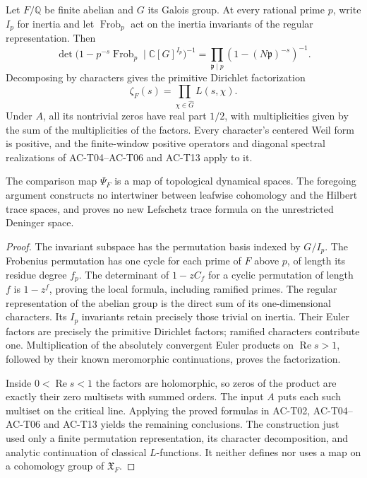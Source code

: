 \begin{theorem}
\label{AC-T18}
Let \(F/\mathbb Q\) be finite abelian and \(G\) its Galois group.
At every rational prime \(p\), write \(I_p\) for inertia and let
\(\operatorname{Frob}_p\) act on the inertia invariants of the
regular representation.  Then
\[
 \det\bigl(1-p^{-s}\operatorname{Frob}_p\mid
                    \mathbb C[G]^{I_p}\bigr)^{-1}
   =\prod_{\mathfrak p\mid p}(1-(N\mathfrak p)^{-s})^{-1}.
\]
Decomposing by characters gives the primitive Dirichlet
factorization
\[
 \zeta_F(s)=\prod_{\chi\in\widehat G}L(s,\chi).
\]
Under \(A\), all its nontrivial zeros have real part \(1/2\),
with multiplicities given by the sum of the multiplicities of
the factors.  Every character's centered Weil form is positive,
and the finite-window positive operators and diagonal spectral
realizations of AC-T04--AC-T06 and AC-T13 apply to it.

The comparison map \(\Psi_F\) is a map of topological dynamical
spaces.  The foregoing argument constructs no intertwiner
between leafwise cohomology and the Hilbert trace spaces, and
proves no new Lefschetz trace formula on the unrestricted
Deninger space.
\end{theorem}
\begin{proof}
The invariant subspace has the permutation basis indexed by
\(G/I_p\).  The Frobenius permutation has one cycle for each
prime of \(F\) above \(p\), of length its residue degree \(f_p\).
The determinant of \(1-zC_f\) for a cyclic permutation of length
\(f\) is \(1-z^f\), proving the local formula, including ramified
primes.  The regular representation of the abelian group is the
direct sum of its one-dimensional characters.  Its \(I_p\)
invariants retain precisely those trivial on inertia.
Their Euler factors are precisely the primitive Dirichlet
factors; ramified characters contribute one.
Multiplication of the absolutely convergent Euler products on
\(\operatorname{Re}s>1\), followed by their known meromorphic
continuations, proves the factorization.

Inside \(0<\operatorname{Re}s<1\) the factors are holomorphic,
so zeros of the product are exactly their zero multisets with
summed orders.  The input \(A\) puts each such multiset on the
critical line.  Applying the proved formulas in AC-T02,
AC-T04--AC-T06 and AC-T13 yields the remaining conclusions.
The construction just used only a finite permutation
representation, its character decomposition, and analytic
continuation of classical \(L\)-functions.  It neither defines
nor uses a map on a cohomology group of \(\mathfrak X_F\).
\end{proof}


